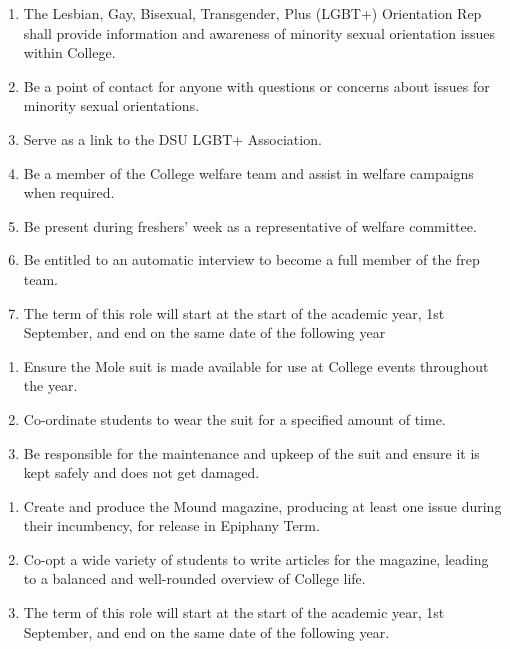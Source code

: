 \begin{enumerate}
    \item The Lesbian, Gay, Bisexual, Transgender, Plus (LGBT+) Orientation Rep shall provide information and awareness of minority sexual orientation issues within College.
    \item Be a point of contact for anyone with questions or concerns about issues for minority sexual orientations.
    \item Serve as a link to the DSU LGBT+ Association.
    \item Be a member of the College welfare team and assist in welfare campaigns when required.
    \item Be present during freshers’ week as a representative of welfare committee. 
    \item Be entitled to an automatic interview to become a full member of the frep team.
    \item The term of this role will start at the start of the academic year, 1st September, and end on the same date of the following year
    
\end{enumerate}

\begin{enumerate}
    \item Ensure the Mole suit is made available for use at College events throughout the year.
    \item Co-ordinate students to wear the suit for a specified amount of time.
    \item Be responsible for the maintenance and upkeep of the suit and ensure it is kept safely and does not get damaged.
    
\end{enumerate}

\begin{enumerate}
    \item Create and produce the Mound magazine, producing at least one issue during their incumbency, for release in Epiphany Term.
    \item  Co-opt a wide variety of students to write articles for the magazine, leading to a balanced and well-rounded overview of College life.
    \item  The term of this role will start at the start of the academic year, 1st September, and end on the same date of the following year.
    
\end{enumerate}

